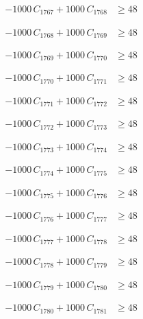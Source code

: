\documentclass[a4paper,11pt]{article}
\begin{document}
\begin{align}
-1000\,C_{1767} + 1000\,C_{1768} &\geq 48 \nonumber
\end{align}

\begin{align}
-1000\,C_{1768} + 1000\,C_{1769} &\geq 48 \nonumber
\end{align}

\begin{align}
-1000\,C_{1769} + 1000\,C_{1770} &\geq 48 \nonumber
\end{align}

\begin{align}
-1000\,C_{1770} + 1000\,C_{1771} &\geq 48 \nonumber
\end{align}

\begin{align}
-1000\,C_{1771} + 1000\,C_{1772} &\geq 48 \nonumber
\end{align}

\begin{align}
-1000\,C_{1772} + 1000\,C_{1773} &\geq 48 \nonumber
\end{align}

\begin{align}
-1000\,C_{1773} + 1000\,C_{1774} &\geq 48 \nonumber
\end{align}

\begin{align}
-1000\,C_{1774} + 1000\,C_{1775} &\geq 48 \nonumber
\end{align}

\begin{align}
-1000\,C_{1775} + 1000\,C_{1776} &\geq 48 \nonumber
\end{align}

\begin{align}
-1000\,C_{1776} + 1000\,C_{1777} &\geq 48 \nonumber
\end{align}

\begin{align}
-1000\,C_{1777} + 1000\,C_{1778} &\geq 48 \nonumber
\end{align}

\begin{align}
-1000\,C_{1778} + 1000\,C_{1779} &\geq 48 \nonumber
\end{align}

\begin{align}
-1000\,C_{1779} + 1000\,C_{1780} &\geq 48 \nonumber
\end{align}

\begin{align}
-1000\,C_{1780} + 1000\,C_{1781} &\geq 48 \nonumber
\end{align}
\end{document}
